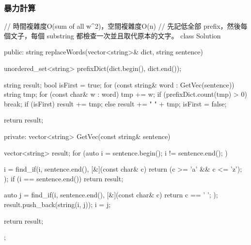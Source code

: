 \subsubsection{暴力計算}
\begin{Code}
// 時間複雜度O(sum of all w^2)，空間複雜度O(n)
// 先記低全部 prefix，然後每個文子，每個 substring 都檢查一次並且取代原本的文字。
class Solution {
public:
    string replaceWords(vector<string>& dict, string sentence) {
        unordered_set<string> prefixDict(dict.begin(), dict.end());

        string result;
        bool isFirst = true;
        for (const string& word : GetVec(sentence))
        {
            string tmp;
            for (const char& w : word)
            {
                tmp += w;
                if (prefixDict.count(tmp) > 0)
                    break;
            }
            if (isFirst)
                result += tmp;
            else
                result += " " + tmp;
            isFirst = false;
        }

        return result;
    }
private:
    vector<string> GetVec(const string& sentence)
    {
        vector<string> result;
        for (auto i = sentence.begin(); i != sentence.end(); )
        {
            i = find_if(i, sentence.end(), [&](const char& c){ return (c >= 'a' && c <= 'z'); });
            if (i == sentence.end()) return result;

            auto j = find_if(i, sentence.end(), [&](const char& c){ return c == ' '; });
            result.push_back(string(i, j));
            i = j;
        }
        return result;
    }
};
\end{Code}
